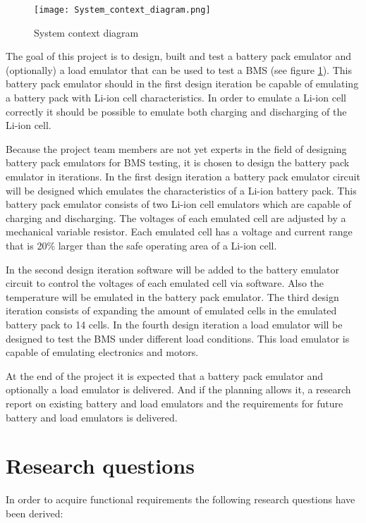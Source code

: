 \begin{figure}[ht]
    \centering
    \texttt{[image: System\_context\_diagram.png]}
    \caption{System context diagram}
    \label{fig:system_context_diagram}
\end{figure}

The goal of this project is to design, built and test a battery pack emulator and (optionally) a load emulator that can be used to test a BMS (see figure \ref{fig:system_context_diagram}). This battery pack emulator should in the first design iteration be capable of emulating a battery pack with Li-ion cell characteristics. In order to emulate a Li-ion cell correctly it should be possible to emulate both charging and discharging of the Li-ion cell. 

Because the project team members are not yet experts in the field of designing battery pack emulators for BMS testing, it is chosen to design the battery pack emulator in iterations. In the first design iteration a battery pack emulator circuit will be designed which emulates the characteristics of a Li-ion battery pack. This battery pack emulator consists of two Li-ion cell emulators which are capable of charging and discharging. The voltages of each emulated cell are adjusted by a mechanical variable resistor. Each emulated cell has a voltage and current range that is 20\% larger than the safe operating area of a Li-ion cell.

In the second design iteration software will be added to the battery emulator circuit to control the voltages of each emulated cell via software. Also the temperature will be emulated in the battery pack emulator. The third design iteration consists of expanding the amount of emulated cells in the emulated battery pack to 14 cells. In the fourth design iteration a load emulator will be designed to test the BMS under different load conditions. This load emulator is capable of emulating electronics and motors. 

At the end of the project it is expected that a battery pack emulator and optionally a load emulator is delivered. And if the planning allows it, a research report on existing battery and load emulators and the requirements for future battery and load emulators is delivered.

\section{Research questions}
In order to acquire functional requirements the following research questions have been derived:

